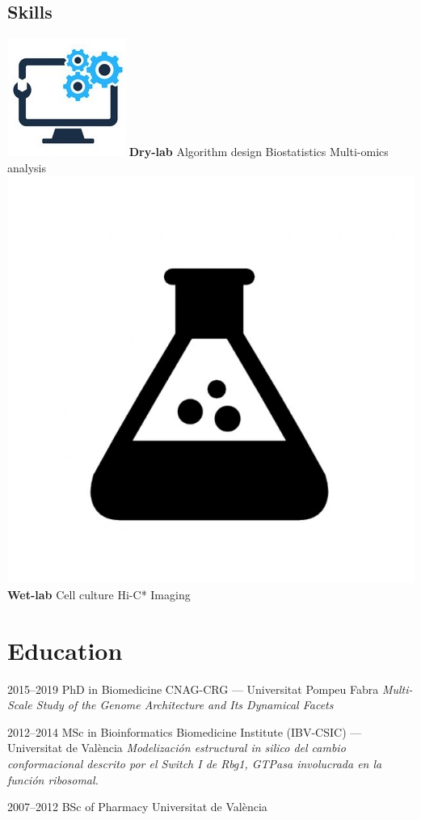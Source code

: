 \documentclass[]{friggeri-cv} %
\begin{document}
\begin{aside}
  \section{Skills}
  \includegraphics[scale=0.12]{computer.jpeg}
  \textbf{Dry-lab}
   Algorithm design
   Biostatistics
   Multi-omics analysis
  \includegraphics[scale=0.04]{wet.jpeg}
  \textbf{Wet-lab}
   Cell culture
   Hi-C*
   Imaging
\end{aside}



\section{Education}

\begin{entrylist}

\entry
{2015--2019}
{PhD {\normalfont in Biomedicine}}
{CNAG-CRG --- Universitat Pompeu Fabra}
{\emph{Multi-Scale Study of the Genome Architecture and Its Dynamical Facets}}

\entry
{2012--2014}
{MSc {\normalfont in Bioinformatics}}
{Biomedicine Institute (IBV-CSIC) --- Universitat de València}
{\emph{Modelización estructural in silico del cambio conformacional descrito por el Switch I de Rbg1, GTPasa involucrada en la función ribosomal.}}

\entry
{2007--2012}
{BSc {\normalfont of Pharmacy}}
{Universitat de València}
{}
\end{entrylist}
\end{document}
